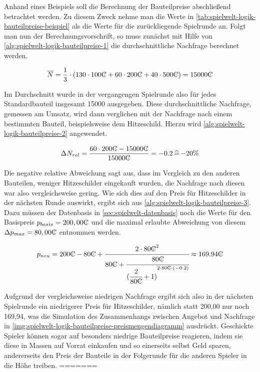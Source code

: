 Anhand eines Beispiels soll die Berechnung der Bauteilpreise abschließend betrachtet werden. Zu diesem Zweck nehme man die Werte in \ref{tab:spielwelt-logik-bauteilpreise-beispiel} als die Werte für die zurückliegende Spielrunde an. Folgt man nun der Berechnungsvorschrift, so muss zunächst mit Hilfe von \ref{alg:spielwelt-logik-bauteilpreise-1} die durchschnittliche Nachfrage berechnet werden.

\newcommand{\tc}{\text{\curr}}
\begin{equation}
     \overline{N} = \frac{1}{3} \cdot {(130 \cdot 100 \tc + 60 \cdot 200 \tc + 40 \cdot 500 \tc)} = 15000 \tc \nonumber
\end{equation}

Im Durchschnitt wurde in der vergangengen Spielrunde also für jedes Standardbauteil insgesamt 15000\curr{} ausgegeben. Diese durchschnittliche Nachfrage, gemessen am Umsatz, wird dann verglichen mit der Nachfrage nach einem bestimmten Bauteil, beispielsweise dem Hitzeschild. Hierzu wird \ref{alg:spielwelt-logik-bauteilpreise-2} angewendet.

\begin{equation}
     \Delta{}N_{rel} = \frac{60 \cdot 200 \tc - 15000 \tc}{15000 \tc} = -0.2 \mathop{\widehat{=}} -20\% \nonumber
\end{equation}

Die negative relative Abweichung sagt aus, dass im Vergleich zu den anderen Bauteilen, weniger Hitzeschilder eingekauft wurden, die Nachfrage nach diesen war also vergleichsweise gering. Wie sich dies auf den Preis für Hitzeschilder in der nächsten Runde auswirkt, ergibt sich aus \ref{alg:spielwelt-logik-bauteilpreise-3}. Dazu müssen der Datenbasis in \ref{sec:spielwelt-datenbasis} noch die Werte für den Basispreis $p_{basis} = 200,00\tc$ und die maximal erlaubte Abweichung von diesem $\Delta{}p_{max} = 80,00\tc$ entnommen werden.

\begin{large}
\begin{equation}
     p_{neu} = 200 \tc -80 \tc + \cfrac{2 \cdot 80 \tc^2}{80 \tc + \cfrac{80 \tc}{({\cfrac{2}{80 \tc} + 1)}^{2 \cdot 80 \tc \cdot (-0.2)}}} \approx 169.94 \tc \nonumber
\end{equation}
\end{large}

Aufgrund der vergleichsweise niedrigen Nachfrage ergibt sich also in der nächsten Spielrunde ein niedrigerer Preis für Hitzeschilder, nämlich statt 200,00\curr{} nur noch 169,94\curr{}, was die Simulation des Zusammenhangs zwischen Angebot und Nachfrage in \ref{img:spielwelt-logik-bauteilpreise-preismengendiagramm} ausdrückt. Geschickte Spieler können sogar auf besonders niedrige Bauteilpreise reagieren, indem sie diese in Massen auf Vorrat einkaufen und so einerseits selbst Geld sparen, andererseits den Preis der Bauteile in der Folgerunde für die anderen Spieler in die Höhe treiben.
=======
